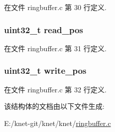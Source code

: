在文件 ringbuffer.\+c 第 30 行定义.

\hypertarget{struct__ringbuffer__t_a7a7c296c9063d85aeecac846c73c2775}{}
\subsubsection[{read\+\_\+pos}]{\setlength{\rightskip}{0pt plus 5cm}uint32\+\_\+t read\+\_\+pos}\label{struct__ringbuffer__t_a7a7c296c9063d85aeecac846c73c2775}


在文件 ringbuffer.\+c 第 31 行定义.

\hypertarget{struct__ringbuffer__t_ab1cb0fa55deec8b7cfec28fac1f81700}{}
\subsubsection[{write\+\_\+pos}]{\setlength{\rightskip}{0pt plus 5cm}uint32\+\_\+t write\+\_\+pos}\label{struct__ringbuffer__t_ab1cb0fa55deec8b7cfec28fac1f81700}


在文件 ringbuffer.\+c 第 32 行定义.



该结构体的文档由以下文件生成\+:\begin{DoxyCompactItemize}
\item 
E\+:/knet-\/git/knet/knet/\hyperlink{ringbuffer_8c}{ringbuffer.\+c}\end{DoxyCompactItemize}

